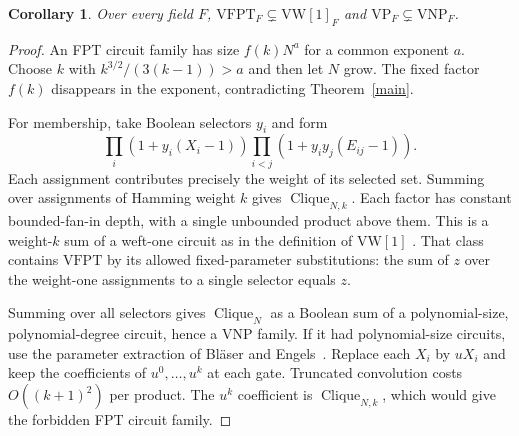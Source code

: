 \documentclass[11pt,letterpaper]{article}
\newtheorem{corollary}[theorem]{Corollary}
\newcommand{\Cl}{\operatorname{Clique}}
\begin{document}
\begin{corollary}
Over every field $F$, $\mathrm{VFPT}_F\subsetneq\mathrm{VW}[1]_F$
and $\mathrm{VP}_F\subsetneq\mathrm{VNP}_F$.
\end{corollary}
\begin{proof}
An FPT circuit family has size $f(k)N^a$ for a common exponent $a$.
Choose $k$ with $k^{3/2}/(3(k-1))>a$ and then let $N$ grow.
The fixed factor $f(k)$ disappears in the exponent, contradicting
Theorem~\ref{main}.

For membership, take Boolean selectors $y_i$ and form
\[
  \prod_i(1+y_i(X_i-1))
      \prod_{i<j}(1+y_i y_j(E_{ij}-1)).
\]
Each assignment contributes precisely the weight of its selected set.
Summing over assignments of Hamming weight $k$ gives $\Cl_{N,k}$.
Each factor has constant bounded-fan-in depth, with a single unbounded
product above them. This is a weight-$k$ sum of a weft-one circuit as
in the definition of $\mathrm{VW}[1]$ \cite{be}. That class contains
$\mathrm{VFPT}$ by its allowed fixed-parameter substitutions: the sum
of $z$ over the weight-one assignments to a single selector equals $z$.

Summing over all selectors gives $\Cl_N$ as a Boolean sum of a
polynomial-size, polynomial-degree circuit, hence a VNP family.
If it had polynomial-size circuits, use the parameter extraction of Bl\"aser and Engels~\cite[Theorem~6.4, full version]{be}. Replace each $X_i$ by $uX_i$ and
keep the coefficients of $u^0,\ldots,u^k$ at each gate. Truncated
convolution costs $O((k+1)^2)$ per product. The $u^k$ coefficient is
$\Cl_{N,k}$, which would give the forbidden FPT circuit family.
\end{proof}



\end{document}
